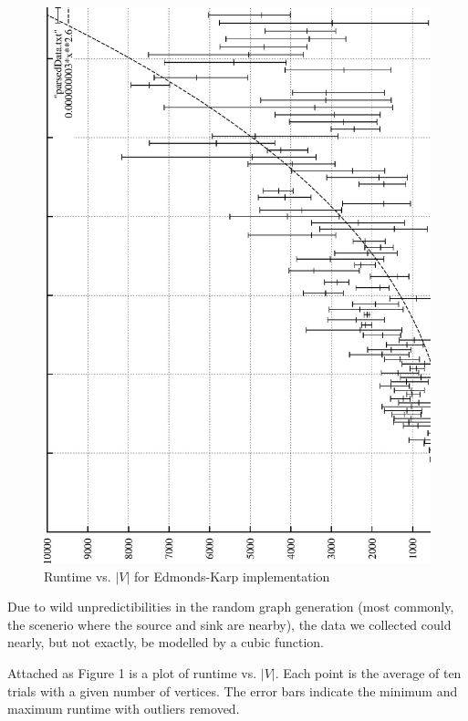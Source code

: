 \documentclass[letterpaper,notitlepage]{report}
\begin{document}
\begin{figure}
	\includegraphics{graph.eps}
	\caption{Runtime vs. $|V|$ for Edmonds-Karp implementation}
\end{figure}

Due to wild unpredictibilities in the random graph generation (most commonly, the scenerio where the source and sink are nearby), the data we collected could nearly, but not exactly, be modelled by a cubic function.

Attached as Figure 1 is a plot of runtime vs. $|V|$. Each point is the average of ten trials with a given number of vertices. The error bars indicate the minimum and maximum runtime with outliers removed.
\end{document}
